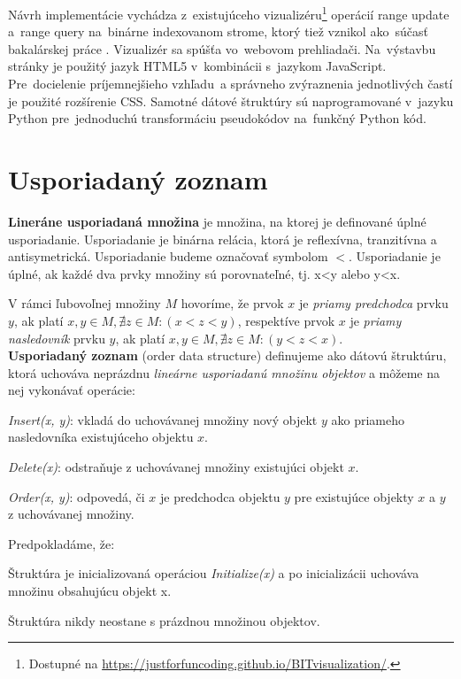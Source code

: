 \documentclass[
  digital,     %
  oneside,     %
  nosansbold,  %
  nocolorbold, %
  lof,         %
  lot,         %
]{fithesis4}
\begin{document}
Návrh implementácie vychádza z~existujúceho vizualizéru\footnote{Dostupné na \url{ https://justforfuncoding.github.io/BITvisualization/}.} operácií  range update a~range query na~binárne indexovanom strome, ktorý tiež vznikol ako~súčasť bakalárskej práce \cite{Kridl2022thesis}. Vizualizér sa spúšťa vo~webovom prehliadači. Na~výstavbu stránky je použitý jazyk HTML5 v~kombinácii s~jazykom JavaScript. Pre~docielenie príjemnejšieho vzhľadu~a správneho zvýraznenia jednotlivých častí je použité rozšírenie CSS. Samotné dátové štruktúry sú naprogramované v~jazyku Python pre~jednoduchú transformáciu pseudokódov na~funkčný Python kód.


\chapter{Usporiadaný zoznam}

\textbf{Lineráne usporiadaná množina} je množina, na ktorej je definované úplné usporiadanie. Usporiadanie je binárna relácia, ktorá je reflexívna, tranzitívna a antisymetrická. Usporiadanie budeme označovať symbolom $<$. Usporiadanie je úplné, ak každé dva prvky množiny sú porovnateľné, tj. x<y alebo y<x.

V rámci ľubovoľnej množiny $M$ hovoríme, že prvok $x$ je \emph{priamy predchodca} prvku $y$, ak platí $x, y \in M, \nexists z \in M: (x < z < y)$, respektíve prvok $x$ je \emph{priamy nasledovník} prvku $y$, ak platí $x, y \in M, \nexists z \in M: (y < z < x)$.\\

\textbf{Usporiadaný zoznam} (order data structure) definujeme ako dátovú štruktúru, ktorá uchováva neprázdnu \textit{lineárne usporiadanú množinu objektov} a môžeme na nej vykonávať operácie:
\begin{compactenum}
    \item \textit{Insert(x, y)}: vkladá do uchovávanej množiny nový objekt $y$ ako priameho nasledovníka existujúceho objektu $x$.

    \item \textit{Delete(x)}: odstraňuje z uchovávanej množiny existujúci objekt $x$.
    \item \textit{Order(x, y)}: odpovedá, či $x$ je predchodca objektu $y$ pre existujúce objekty $x$ a $y$ z uchovávanej množiny.
\end{compactenum}
Predpokladáme, že:
\begin{compactitem}
    \item Štruktúra je inicializovaná operáciou \textit{Initialize(x)} a po inicializácii uchováva množinu obsahujúcu objekt x.
    \item Štruktúra nikdy neostane s prázdnou množinou objektov.\\
\end{compactitem}
\end{document}
